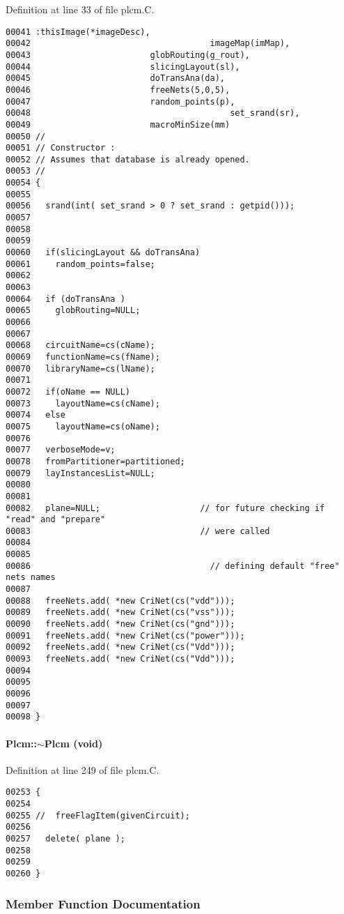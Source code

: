 Definition at line 33 of file plcm.C.\small\begin{verbatim}00041 :thisImage(*imageDesc),
00042                                    imageMap(imMap),
00043                        globRouting(g_rout),
00044                        slicingLayout(sl),
00045                        doTransAna(da),
00046                        freeNets(5,0,5),
00047                        random_points(p),
00048                                        set_srand(sr),
00049                        macroMinSize(mm)
00050 //
00051 // Constructor :
00052 // Assumes that database is already opened.
00053 //
00054 {
00055 
00056   srand(int( set_srand > 0 ? set_srand : getpid()));
00057 
00058 
00059   
00060   if(slicingLayout && doTransAna)
00061     random_points=false;
00062 
00063 
00064   if (doTransAna )
00065     globRouting=NULL;
00066 
00067   
00068   circuitName=cs(cName);
00069   functionName=cs(fName);
00070   libraryName=cs(lName);
00071 
00072   if(oName == NULL)
00073     layoutName=cs(cName);
00074   else
00075     layoutName=cs(oName);
00076 
00077   verboseMode=v;
00078   fromPartitioner=partitioned;
00079   layInstancesList=NULL;
00080   
00081 
00082   plane=NULL;                    // for future checking if "read" and "prepare"
00083                                  // were called
00084 
00085 
00086                                    // defining default "free" nets names
00087 
00088   freeNets.add( *new CriNet(cs("vdd")));
00089   freeNets.add( *new CriNet(cs("vss")));
00090   freeNets.add( *new CriNet(cs("gnd")));
00091   freeNets.add( *new CriNet(cs("power")));
00092   freeNets.add( *new CriNet(cs("Vdd")));
00093   freeNets.add( *new CriNet(cs("Vdd")));
00094 
00095 
00096 
00097 
00098 }
\end{verbatim}\normalsize 
\label{Plcm_a1}
\paragraph{\setlength{\rightskip}{0pt plus 5cm}Plcm::$\sim$Plcm (void)}\hfill



Definition at line 249 of file plcm.C.\small\begin{verbatim}00253 {
00254 
00255 //  freeFlagItem(givenCircuit);
00256 
00257   delete( plane );
00258 
00259 
00260 }
\end{verbatim}\normalsize 


\subsubsection{Member Function Documentation}
\label{Plcm_a11}
